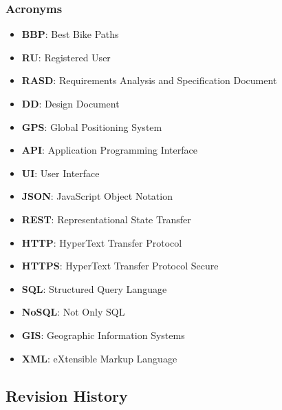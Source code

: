 \subsubsection{Acronyms}
\begin{itemize}
    \item \textbf{BBP}: Best Bike Paths
    \item \textbf{RU}: Registered User
    \item \textbf{RASD}: Requirements Analysis and Specification Document
    \item \textbf{DD}: Design Document
    \item \textbf{GPS}: Global Positioning System
    \item \textbf{API}: Application Programming Interface
    \item \textbf{UI}: User Interface
    \item \textbf{JSON}: JavaScript Object Notation
    \item \textbf{REST}: Representational State Transfer
    \item \textbf{HTTP}: HyperText Transfer Protocol
    \item \textbf{HTTPS}: HyperText Transfer Protocol Secure
    \item \textbf{SQL}: Structured Query Language
    \item \textbf{NoSQL}: Not Only SQL
    \item \textbf{GIS}: Geographic Information Systems
    \item \textbf{XML}: eXtensible Markup Language
\end{itemize}

\subsection{Revision History}
